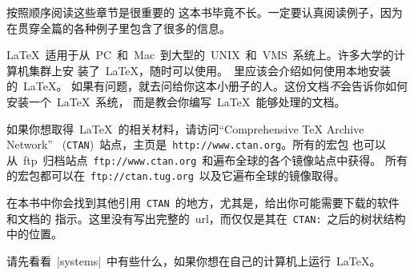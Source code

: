 \bigskip
\noindent 按照顺序阅读这些章节是很重要的
\pozhehao 这本书毕竟不长。一定要认真阅读例子，因为在贯穿全篇的各种例子里包含了很多的信息。%

\bigskip
\noindent
\LaTeX{}~适用于从~PC~和~Mac~到大型的~UNIX~和~VMS~系统上。许多大学的计算机集群上安
装了~\LaTeX{}，随时可以使用。\guide~里应该会介绍如何使用本地安装的~\LaTeX{}。
如果有问题，就去问给你这本小册子的人。这份文档\emph{不}会告诉你如何安装一个~\LaTeX{}~系统，
而是教会你编写~\LaTeX{}~能够处理的文档。

\bigskip
\noindent 如果你想取得~\LaTeX{}~的相关材料，请访问“Comprehensive
\TeX{} Archive Network”
~(\texttt{CTAN})~站点，主页是~\texttt{http://www.ctan.org}。所有的宏包
也可以从~ftp~归档站点~\texttt{ftp://www.ctan.org}~和遍布全球的各个镜像站点中获得。
所有的宏包都可以在~\texttt{ftp://ctan.tug.org}~以及它遍布全球的镜像取得。

在本书中你会找到其他引用~\texttt{CTAN}~的地方，尤其是，给出你可能需要下载的软件和文档的
指示。这里没有写出完整的~url，而仅仅是其在~\texttt{CTAN:}~之后的树状结构中的位置。%


请先看看~\CTAN|systems|~中有些什么，如果你想在自己的计算机上运行~\LaTeX{}。%

